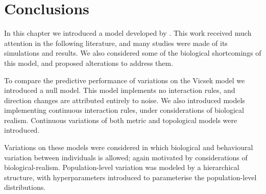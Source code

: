 \section*{Conclusions}

In this chapter we introduced a model developed by \textcite{vicsek95}. This
work received much attention in the following literature, and many studies were
made of its simulations and results. We also considered some of the biological
shortcomings of this model, and proposed alterations to address them.

To compare the predictive performance of variations on the Vicsek model we
introduced a null model. This model implements no interaction rules, and
direction changes are attributed entirely to noise. We also introduced models
implementing continuous interaction rules, under considerations of biological
realism. Continuous variations of both metric and topological models were
introduced.

Variations on these models were considered in which biological and behavioural
variation between individuals is allowed; again motivated by considerations of
biological-realism. Population-level variation was modeled by a hierarchical
structure, with hyperparameters introduced to parameterise the population-level
distributions.

